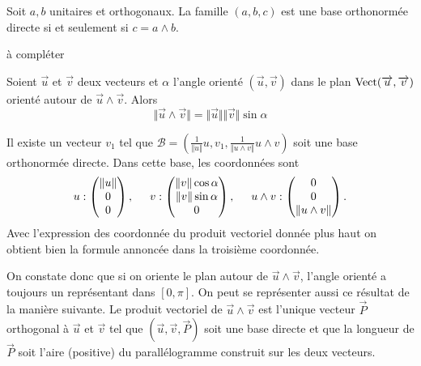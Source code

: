 \begin{propn}
 Soit $a,b$ unitaires et orthogonaux. La famille $(a,b,c)$ est une base orthonormée directe si et seulement si $c = a \wedge b$. 
\end{propn}
\begin{demo}
 à compléter
\end{demo}

\begin{propn}
 Soient $\overrightarrow u$ et $\overrightarrow v$ deux vecteurs et $\alpha$ l'angle orienté $(\overrightarrow u , \overrightarrow v)$ dans le plan $\mathop{\mathrm{Vect}}(\overrightarrow u , \overrightarrow v)$ orienté autour de $\overrightarrow u \wedge \overrightarrow v$. Alors
\begin{displaymath}
 \Vert \overrightarrow u \wedge \overrightarrow v\Vert =
 \Vert \overrightarrow u \Vert  \Vert\overrightarrow v\Vert \sin \alpha
\end{displaymath}
\end{propn}
\begin{demo}
 Il existe un vecteur $v_1$ tel que $\mathcal{B} = (\frac{1}{\Vert u\Vert}u, v_1 , \frac{1}{\Vert u\wedge v \Vert} u\wedge v)$ soit une base orthonormée directe. Dans cette base, les coordonnées sont
 \[
  u: 
  \begin{pmatrix}
   \Vert u\Vert \\ 0 \\ 0
  \end{pmatrix}
, \hspace{0.5cm}
  v: 
  \begin{pmatrix}
   \Vert v\Vert \cos \alpha \\ \Vert v\Vert \sin \alpha  \\ 0
  \end{pmatrix}
, \hspace{0.5cm}
u \wedge v : 
\begin{pmatrix}
 0 \\ 0 \\ \Vert u\wedge v\Vert
\end{pmatrix}.
 \]
Avec l'expression des coordonnée du produit vectoriel donnée plus haut on obtient bien la formule annoncée dans la troisième coordonnée.
\end{demo}
\begin{rem}
 On constate donc que si on oriente le plan autour de $\overrightarrow u \wedge \overrightarrow v$, l'angle orienté a toujours un représentant dans $[0,\pi]$. On peut se représenter aussi ce résultat de la manière suivante. Le produit vectoriel de $\overrightarrow u \wedge \overrightarrow v$ est l'unique vecteur $\overrightarrow P$ orthogonal à $\overrightarrow u$ et $\overrightarrow v$ tel que $(\overrightarrow u, \overrightarrow v, \overrightarrow P)$ soit une base directe et que la longueur de $\overrightarrow P$ soit l'aire (positive) du parallélogramme construit sur les deux vecteurs.
\end{rem}

